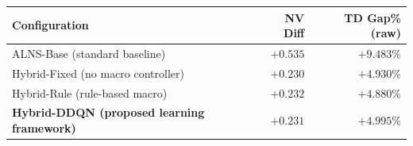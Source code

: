 \caption{Ablation Analysis: Component contributions (overall $N=176$ instances). NV Diff (mean fleet gap to BKS) drops sharply from ALNS-Base to any hybrid variant, then flattens among hybrids. Raw TD Gap rises in lock-step --- an arithmetic consequence of fewer vehicles covering the same customers, \emph{not} a quality loss; the valid, vehicle-matched distance comparison is the strict fair intersection of Table~\ref{tab:distance_summary}, where Hybrid-DDQN attains the lowest gap ($+1.078\%$).}
\label{tab:ablation}
\begin{tabular}{@{}lrr@{}}
\toprule
\textbf{Configuration} & \textbf{NV Diff} & \textbf{TD Gap\% (raw)}\\
\midrule
ALNS-Base (standard baseline) & $+0.535$ & $+9.483\%$ \\
Hybrid-Fixed (no macro controller) & $+0.230$ & $+4.930\%$ \\
Hybrid-Rule (rule-based macro) & $+0.232$ & $+4.880\%$ \\
\textbf{Hybrid-DDQN (proposed learning framework)} & $\mathbf{+0.231}$ & $+4.995\%$ \\
\bottomrule
\end{tabular}

